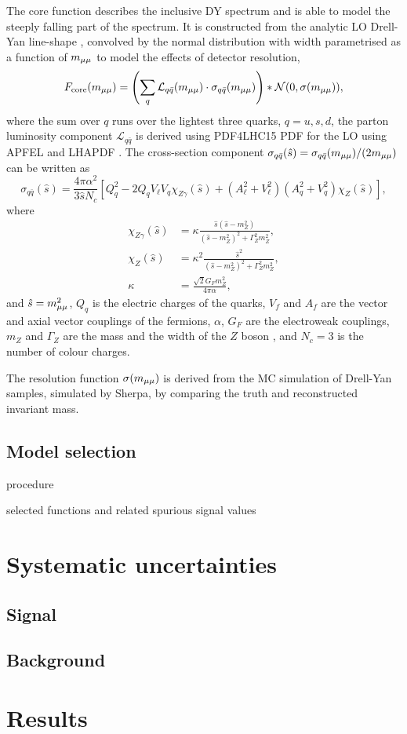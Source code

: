 The core function describes the inclusive DY spectrum and
is able to model the steeply falling part of the spectrum.
It is constructed from the analytic LO Drell-Yan line-shape
\cite{Aaboud:2017ffb}, convolved by the normal distribution
with width parametrised as a function of $m_{\mu\mu}$ to model
the effects of detector resolution,
\begin{equation}
F_\text{core}(m_{\mu\mu}) =
\left( \sum_q \mathcal{L}_{q\bar q}(m_{\mu\mu}) \cdot \sigma_{q\bar q}(m_{\mu\mu}) \right) * \mathcal{N}(0, \sigma(m_{\mu\mu})),
\end{equation}
where the sum over $q$ runs over the lightest three quarks,
$q = u, s, d$, the parton luminosity component $\mathcal{L}_{q\bar q}$
is derived using PDF4LHC15 PDF for the LO using APFEL
\cite{Bertone:2013vaa} and LHAPDF \cite{Buckley:2014ana}.
The cross-section component
$\sigma_{q\bar q}(\hat s) = \sigma_{q\bar q}(m_{\mu\mu}) / (2m_{\mu\mu})$
can be written as \cite{ATLAS-CONF-2019-028}
\begin{equation}
\sigma_{q\bar q}(\hat s) = \frac{4\pi \alpha^2}{3\hat s N_c}
\left[
Q_q^2 - 2 Q_q V_\ell V_q \chi_{Z\gamma} (\hat s) +
(A_\ell^2 + V_\ell^2) (A_q^2 + V_q^2) \chi_Z(\hat s)
\right],
\end{equation}
where
\begin{align}
 \chi_{Z\gamma}(\hat s) & = \kappa \frac{\hat s (\hat s - m_Z^2)}{(\hat s - m_Z^2)^2 + \Gamma_Z^2 m_Z^2}, \\
 \chi_{Z}(\hat s)       & = \kappa^2 \frac{{\hat s}^2}{(\hat s - m_Z^2)^2 + \Gamma_Z^2 m_Z^2}, \\
 \kappa                 & = \frac{\sqrt{2}G_Fm_Z^2}{4\pi \alpha},
\end{align}
and $\hat s = m_{\mu\mu}^2$, $Q_q$ is the electric charges of the quarks,
$V_f$ and $A_f$ are the vector and axial vector couplings of the fermions,
$\alpha$, $G_F$ are the electroweak couplings,
$m_Z$ and $\Gamma_Z$ are the mass and the width of the $Z$ boson \cite{Patrignani:2016xqp},
and $N_c = 3$ is the number of colour charges.

The resolution function $\sigma(m_{\mu\mu})$ is derived from the
MC simulation of Drell-Yan samples, simulated by Sherpa,
by comparing the truth and reconstructed invariant mass.

\subsection{Model selection}

procedure

selected functions and related spurious signal values

\section{Systematic uncertainties}

\subsection{Signal}

\subsection{Background}

\section{Results}



